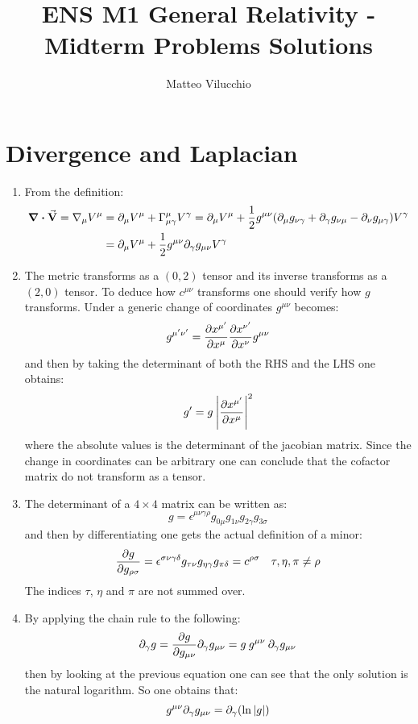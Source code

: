 \documentclass[11pt, oneside]{article}
\title{ENS M1 General Relativity - Midterm Problems Solutions}
\author{Matteo Vilucchio}
\newcommand{\G}{\Gamma}
\begin{document}
\maketitle

\section{Divergence and Laplacian}
\begin{enumerate}
\item From the definition:
\begin{align*}
	\div{\va{V}} = \nabla_\mu V^\mu &= \partial_\mu V^\mu + \G_{\mu\gamma}^\mu V^\gamma = \partial_\mu V^\mu + \frac{1}{2} g^{\mu\nu}\qty( \partial_\mu g_{\nu\gamma} + \partial_\gamma g_{\nu\mu} - \partial_\nu g_{\mu\gamma})V^\gamma \\
	&= \partial_\mu V^\mu + \frac{1}{2} g^{\mu\nu}\partial_\gamma g_{\mu\nu} V^\gamma
\end{align*}

\item The metric transforms as a $(0,2)$ tensor and its inverse transforms as a $(2,0)$ tensor. To deduce how $c^{\mu\nu}$ transforms one should verify how $g$ transforms. Under a generic change of coordinates $g^{\mu\nu}$ becomes:
\[
	g^{\mu'\nu'} = \pdv{x^{\mu'}}{x^{\mu}} \pdv{x^{\nu'}}{x^{\nu}} g^{\mu\nu}
\]
and then by taking the determinant of both the RHS and the LHS one obtains:
\[
	g' = g \: \abs{\pdv{x^{\mu'}}{x^{\mu}}}^2
\]
where the absolute values is the determinant of the jacobian matrix. Since the change in coordinates can be arbitrary one can conclude that the cofactor matrix do not transform as a tensor.

\item The determinant of a $4\times4$ matrix can be written as:
\[
	g = \epsilon^{\mu\nu\gamma\rho} g_{0\mu} g_{1\nu} g_{2\gamma} g_{3\sigma}
\]
and then by differentiating one gets the actual definition of a minor:
\[
	\pdv{g}{g_{\rho\sigma}} = \epsilon^{\sigma\nu\gamma\delta} g_{\tau \nu}g_{\eta \gamma} g_{\pi\delta} = c^{\rho\sigma} \quad \tau, \eta, \pi \neq \rho
\]
The indices $\tau$, $\eta$ and $\pi$ are not summed over.

\item By applying the chain rule to the following:
\[
	\partial_\gamma g = \pdv{g}{g_{\mu\nu}} \partial_\gamma g_{\mu\nu} = g\: g^{\mu\nu}\:\partial_\gamma g_{\mu\nu}
\]
then by looking at the previous equation one can see that the only solution is the natural logarithm. So one obtains that:
\[
	g^{\mu\nu} \partial_\gamma g_{\mu\nu} = \partial_{\gamma}\qty( \ln \abs{g})
\]


\end{enumerate}
\end{document}
